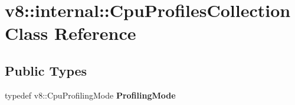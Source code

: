 \hypertarget{classv8_1_1internal_1_1CpuProfilesCollection}{}\section{v8\+:\+:internal\+:\+:Cpu\+Profiles\+Collection Class Reference}
\label{classv8_1_1internal_1_1CpuProfilesCollection}
\subsection*{Public Types}
\begin{DoxyCompactItemize}
\item 
\mbox{\label{classv8_1_1internal_1_1CpuProfilesCollection_a2478357a99aa17b4e62ea4945c24a63d}} 
typedef v8\+::\+Cpu\+Profiling\+Mode {\bfseries Profiling\+Mode}
\end{DoxyCompactItemize}
